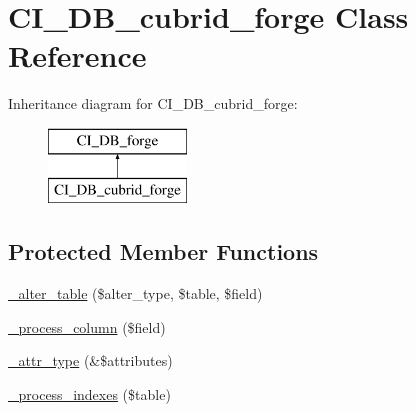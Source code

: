 \hypertarget{class_c_i___d_b__cubrid__forge}{}\section{C\+I\+\_\+\+D\+B\+\_\+cubrid\+\_\+forge Class Reference}
\label{class_c_i___d_b__cubrid__forge}
Inheritance diagram for C\+I\+\_\+\+D\+B\+\_\+cubrid\+\_\+forge\+:\begin{figure}[H]
\begin{center}
\leavevmode
\includegraphics[height=2.000000cm]{class_c_i___d_b__cubrid__forge}
\end{center}
\end{figure}
\subsection*{Protected Member Functions}
\begin{DoxyCompactItemize}
\item 
\mbox{\hyperlink{class_c_i___d_b__cubrid__forge_aef4960cd83bcab5640b24a890d2ef9ce}{\+\_\+alter\+\_\+table}} (\$alter\+\_\+type, \$table, \$field)
\item 
\mbox{\hyperlink{class_c_i___d_b__cubrid__forge_a10388a1236c3debc16508354576f30fb}{\+\_\+process\+\_\+column}} (\$field)
\item 
\mbox{\hyperlink{class_c_i___d_b__cubrid__forge_a27ba0924f820e5f1e57e3d1f7e6515be}{\+\_\+attr\+\_\+type}} (\&\$attributes)
\item 
\mbox{\hyperlink{class_c_i___d_b__cubrid__forge_a170ca2c77a817a94b6d8903912995b7f}{\+\_\+process\+\_\+indexes}} (\$table)
\end{DoxyCompactItemize}
